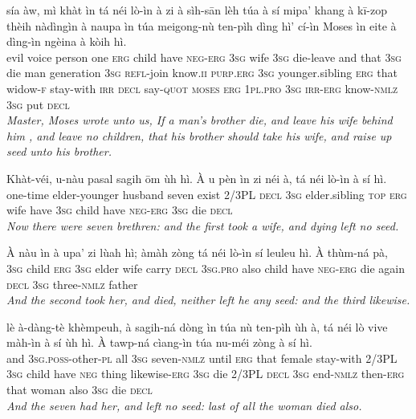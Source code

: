 \documentclass[11pt,a4paper]{article}
\begin{document}
\begin{exe}
\gll sía àw, mì khàt ìn tá néi lò-ìn à zi à sìh-sān lèh túa à sí mipa' khang à kī-zop thèih nàdìngìn à naupa ìn túa meigong-nù ten-pìh dìng hì' cí-ìn Moses ìn eite à dìng-ìn ngèina à kòih hì. \\
     evil voice person one \textsc{erg} child have \textsc{neg}-\textsc{erg} \textsc{3sg} wife \textsc{3sg} die-leave and that \textsc{3sg} die man generation \textsc{3sg} \textsc{refl}-join know.\textsc{ii} \textsc{purp}.\textsc{erg} \textsc{3sg} younger.sibling \textsc{erg} that widow-\textsc{f} stay-with \textsc{irr} \textsc{decl} say-\textsc{quot} \textsc{moses} \textsc{erg} \textsc{1pl}.\textsc{pro} \textsc{3sg} \textsc{irr}-\textsc{erg} know-\textsc{nmlz} \textsc{3sg} put \textsc{decl} \\
\glt \textcolor{kjvcolor}{\textit{Master, Moses wrote unto us, If a man's brother die, and leave his wife behind him , and leave no children, that his brother should take his wife, and raise up seed unto his brother.}}

\gll Khàt-véi, u-nàu pasal sagih ōm ùh hì. À u pèn ìn zi néi à, tá néi lò-ìn à sí hì. \\
     one-time elder-younger husband seven exist 2/3PL \textsc{decl} \textsc{3sg} elder.sibling \textsc{top} \textsc{erg} wife have \textsc{3sg} child have \textsc{neg}-\textsc{erg} \textsc{3sg} die \textsc{decl} \\
\glt \textcolor{kjvcolor}{\textit{Now there were seven brethren: and the first took a wife, and dying left no seed.}}

\gll À nàu ìn à upa' zi lùah hì; àmàh zòng tá néi lò-ìn sí leuleu hì. À thùm-ná pà, \\
     \textsc{3sg} child \textsc{erg} \textsc{3sg} elder wife carry \textsc{decl} \textsc{3sg}.\textsc{pro} also child have \textsc{neg}-\textsc{erg} die again \textsc{decl} \textsc{3sg} three-\textsc{nmlz} father \\
\glt \textcolor{kjvcolor}{\textit{And the second took her, and died, neither left he any seed: and the third likewise.}}

\gll lè à-dàng-tè khèmpeuh, à sagih-ná dòng ìn túa nù ten-pìh ùh à, tá néi lò vive màh-ìn à sí ùh hì. À tawp-ná cìang-ìn túa nu-méi zòng à sí hì. \\
     and \textsc{3sg}.\textsc{poss}-other-\textsc{pl} all \textsc{3sg} seven-\textsc{nmlz} until \textsc{erg} that female stay-with 2/3PL \textsc{3sg} child have \textsc{neg} thing likewise-\textsc{erg} \textsc{3sg} die 2/3PL \textsc{decl} \textsc{3sg} end-\textsc{nmlz} then-\textsc{erg} that woman also \textsc{3sg} die \textsc{decl} \\
\glt \textcolor{kjvcolor}{\textit{And the seven had her, and left no seed: last of all the woman died also.}}


\end{exe}
\end{document}
